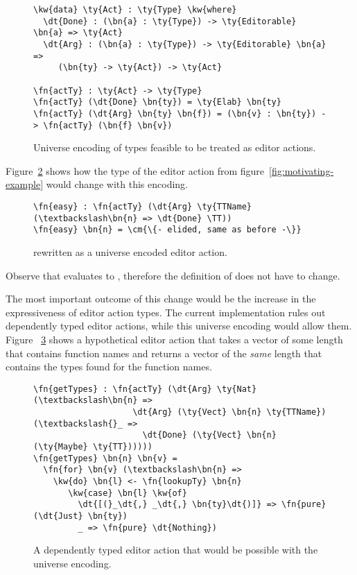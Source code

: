 \begin{figure}[H]
\begin{Verbatim}
\kw{data} \ty{Act} : \ty{Type} \kw{where}
  \dt{Done} : (\bn{a} : \ty{Type}) -> \ty{Editorable} \bn{a} => \ty{Act}
  \dt{Arg} : (\bn{a} : \ty{Type}) -> \ty{Editorable} \bn{a} =>
     (\bn{ty} -> \ty{Act}) -> \ty{Act}

\fn{actTy} : \ty{Act} -> \ty{Type}
\fn{actTy} (\dt{Done} \bn{ty}) = \ty{Elab} \bn{ty}
\fn{actTy} (\dt{Arg} \bn{ty} \bn{f}) = (\bn{v} : \bn{ty}) -> \fn{actTy} (\bn{f} \bn{v})
\end{Verbatim}
\caption{Universe encoding of types feasible to be treated as editor actions.}
\label{code:universe}
\end{figure}

Figure~\ref{code:universe-example} shows how the type of the  editor
action from figure~\ref{fig:motivating-example} would change with this encoding.

\begin{figure}[H]
\begin{Verbatim}
\fn{easy} : \fn{actTy} (\dt{Arg} \ty{TTName} (\textbackslash\bn{n} => \dt{Done} \TT))
\fn{easy} \bn{n} = \cm{\{- elided, same as before -\}}
\end{Verbatim}
\caption{ rewritten as a universe encoded editor action.}
\label{code:universe-example}
\end{figure}

Observe that  evaluates
to , therefore the definition of  does
not have to change.

The most important outcome of this change would be the increase in the
expressiveness of editor action types. The current implementation rules out
dependently typed editor actions, while this universe encoding would allow
them. Figure ~\ref{code:universe-dependent} shows a
hypothetical editor action that takes a vector of some length that contains
function names and returns a vector of the \emph{same} length that contains the types
found for the function names.

\begin{figure}[H]
\begin{Verbatim}
\fn{getTypes} : \fn{actTy} (\dt{Arg} \ty{Nat} (\textbackslash\bn{n} =>
                    \dt{Arg} (\ty{Vect} \bn{n} \ty{TTName}) (\textbackslash{}_ =>
                      \dt{Done} (\ty{Vect} \bn{n} (\ty{Maybe} \ty{TT})))))
\fn{getTypes} \bn{n} \bn{v} =
  \fn{for} \bn{v} (\textbackslash\bn{n} =>
    \kw{do} \bn{l} <- \fn{lookupTy} \bn{n}
       \kw{case} \bn{l} \kw{of}
         \dt{[(}_\dt{,} _\dt{,} \bn{ty}\dt{)]} => \fn{pure} (\dt{Just} \bn{ty})
         _ => \fn{pure} \dt{Nothing})
\end{Verbatim}
\caption{A dependently typed editor action that would be possible with the universe encoding.}
\label{code:universe-dependent}
\end{figure}

